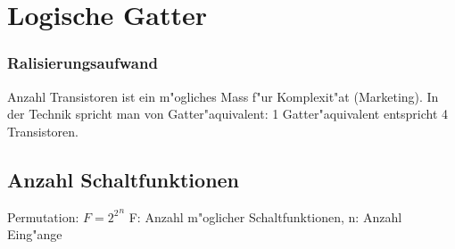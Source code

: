 \section{Logische Gatter}

\subsubsection{Ralisierungsaufwand}
Anzahl Transistoren ist ein m"ogliches Mass f"ur Komplexit"at (Marketing). In der Technik spricht man von Gatter"aquivalent: 1 Gatter"aquivalent entspricht 4 Transistoren.

\subsection{Anzahl Schaltfunktionen}
Permutation: $F= {2^2}^n$ F: Anzahl m"oglicher Schaltfunktionen, n: Anzahl Eing"ange

